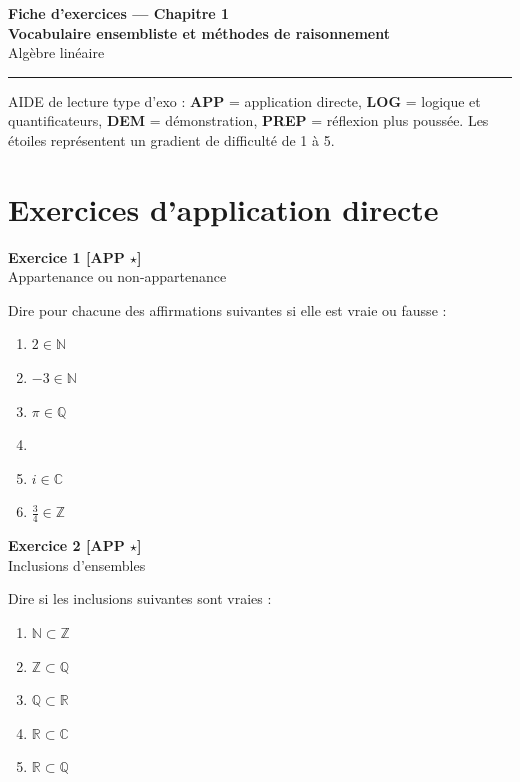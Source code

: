\documentclass[11pt,a4paper]{article}
\newcommand{\R}{\mathbb{R}}
\newcommand{\N}{\mathbb{N}}
\newcommand{\Z}{\mathbb{Z}}
\newcommand{\Q}{\mathbb{Q}}
\newcommand{\C}{\mathbb{C}}
\begin{document}
\begin{center}
    {\LARGE \textbf{Fiche d’exercices --- Chapitre 1}}\\[0.3em]
    {\Large \textbf{Vocabulaire ensembliste et méthodes de raisonnement}}\\[0.5em]
    {\large Algèbre linéaire}
\end{center}

\hrule
\vspace{0.8em}

AIDE de lecture type d’exo :  
\textbf{APP} = application directe, \textbf{LOG} = logique et quantificateurs, \textbf{DEM} = démonstration, \textbf{PREP} = réflexion plus poussée.  
Les étoiles représentent un gradient de difficulté de 1 à 5.

\tableofcontents

\newpage

\section*{Exercices d’application directe}

\textbf{Exercice 1 [APP \(\star\)]}\\
Appartenance ou non-appartenance

Dire pour chacune des affirmations suivantes si elle est vraie ou fausse :
\begin{enumerate}[label=\alph*)]
    \item \(2\in \N\)
    \item \(-3\in \N\)
    \item \(\pi\in \Q\)
    \item {}\in \R
    \item \(i\in \C\)
    \item \(\frac{3}{4}\in \Z\)
\end{enumerate}

\textbf{Exercice 2 [APP \(\star\)]}\\
Inclusions d’ensembles

Dire si les inclusions suivantes sont vraies :
\begin{enumerate}[label=\alph*)]
    \item \(\N\subset \Z\)
    \item \(\Z\subset \Q\)
    \item \(\Q\subset \R\)
    \item \(\R\subset \C\)
    \item \(\R\subset \Q\)
\end{enumerate}
\end{document}
